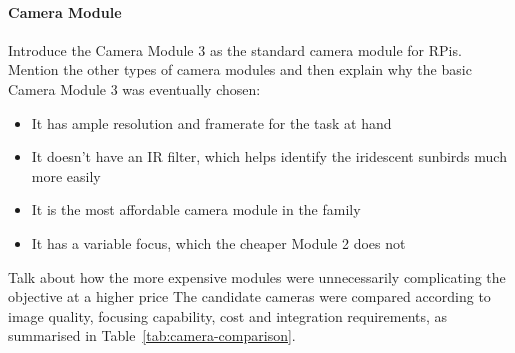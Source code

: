 \paragraph{Camera Module}
\par\vspace{6pt}
Introduce the Camera Module 3 as the standard camera module for RPis. Mention the other types of camera modules and then explain why the basic Camera Module 3 was eventually chosen:
\begin{itemize}
    \item It has ample resolution and framerate for the task at hand
    \item It doesn't have an IR filter, which helps identify the iridescent sunbirds much more easily
    \item It is the most affordable camera module in the family
    \item It has a variable focus, which the cheaper Module 2 does not
\end{itemize}
Talk about how the more expensive modules were unnecessarily complicating the objective at a higher price
The candidate cameras were compared according to image quality, focusing capability, cost and integration requirements, as summarised in Table~\ref{tab:camera-comparison}.

